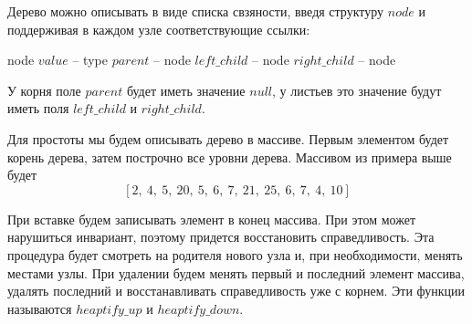 \documentclass[../main.tex]{subfiles}
\begin{document}
		
		
		
		
		
		
		

	Дерево можно описывать в виде списка свзяности, введя структуру $node$ и поддерживая в каждом узле соответствующие ссылки:
	
	\begin{struct}{node}
		\State $value$ -- type
		\State $parent$ -- node
		\State $left\_child$ -- node
		\State $right\_child$ -- node
	\end{struct}
	
	У корня поле $parent$ будет иметь значение $null$, у листьев это значение будут иметь поля $left\_child$ и  $right\_child$.
	
	Для простоты мы будем описывать дерево в массиве. Первым элементом будет корень дерева, затем построчно все уровни дерева. Массивом из примера выше будет
	\[
	[2, \ 4, \ 5, \ 20, \ 5, \ 6, \ 7, \ 21, \ 25, \ 6, \ 7, \ 4, \ 10]
	\]
	
	При вставке будем записывать элемент в конец массива. При этом может нарушиться инвариант, поэтому придется восстановить справедливость. Эта процедура будет смотреть на родителя нового узла и, при необходимости, менять местами узлы. При удалении будем менять первый и последний элемент массива, удалять последний и восстанавливать справедливость уже с корнем. Эти функции называются $heaptify\_up$ и $heaptify\_down$.
\end{document}
